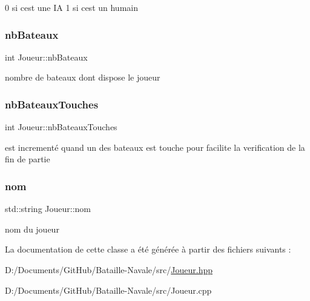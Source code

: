 0 si c\textquotesingle{}est une IA 1 si c\textquotesingle{}est un humain \mbox{\label{class_joueur_a56752b0a96da94b17b07fd0312035a13}} 
\subsubsection{\texorpdfstring{nb\+Bateaux}{nbBateaux}}
{\footnotesize\ttfamily int Joueur\+::nb\+Bateaux\hspace{0.3cm}{\ttfamily [private]}}

nombre de bateaux dont dispose le joueur \mbox{\label{class_joueur_a31a012996f56cdcf9e7a84587cd513fd}} 
\subsubsection{\texorpdfstring{nb\+Bateaux\+Touches}{nbBateauxTouches}}
{\footnotesize\ttfamily int Joueur\+::nb\+Bateaux\+Touches\hspace{0.3cm}{\ttfamily [private]}}

est incrementé quand un des bateaux est touche pour facilite la verification de la fin de partie \mbox{\label{class_joueur_abaee0b4f259181bf66dbab54bef971bb}} 
\subsubsection{\texorpdfstring{nom}{nom}}
{\footnotesize\ttfamily std\+::string Joueur\+::nom\hspace{0.3cm}{\ttfamily [private]}}

nom du joueur 

La documentation de cette classe a été générée à partir des fichiers suivants \+:\begin{DoxyCompactItemize}
\item 
D\+:/\+Documents/\+Git\+Hub/\+Bataille-\/\+Navale/src/\mbox{\hyperlink{_joueur_8hpp}{Joueur.\+hpp}}\item 
D\+:/\+Documents/\+Git\+Hub/\+Bataille-\/\+Navale/src/Joueur.\+cpp\end{DoxyCompactItemize}
